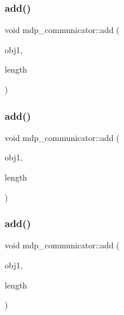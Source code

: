 \mbox{\label{classmdp__communicator_aedb0bdc142ac49ff99bfa185d8f8da09}} 
\subsubsection{\texorpdfstring{add()}{add()}\hspace{0.1cm}{\footnotesize\ttfamily [8/15]}}
{\footnotesize\ttfamily void mdp\+\_\+communicator\+::add (\begin{DoxyParamCaption}\item[{\hyperlink{mdp__global__vars_8h_aaa1ad9d0dcd2124aa5af0120d9954174}{mdp\+\_\+int} $\ast$}]{obj1,  }\item[{\hyperlink{mdp__global__vars_8h_aaa1ad9d0dcd2124aa5af0120d9954174}{mdp\+\_\+int}}]{length }\end{DoxyParamCaption})\hspace{0.3cm}{\ttfamily [inline]}}

\mbox{\label{classmdp__communicator_a931be4e0b188065e33a16877a63bfe01}} 
\subsubsection{\texorpdfstring{add()}{add()}\hspace{0.1cm}{\footnotesize\ttfamily [9/15]}}
{\footnotesize\ttfamily void mdp\+\_\+communicator\+::add (\begin{DoxyParamCaption}\item[{float $\ast$}]{obj1,  }\item[{\hyperlink{mdp__global__vars_8h_aaa1ad9d0dcd2124aa5af0120d9954174}{mdp\+\_\+int}}]{length }\end{DoxyParamCaption})\hspace{0.3cm}{\ttfamily [inline]}}

\mbox{\label{classmdp__communicator_ac78cceeab56a8e83a1921e1e930ce7d1}} 
\subsubsection{\texorpdfstring{add()}{add()}\hspace{0.1cm}{\footnotesize\ttfamily [10/15]}}
{\footnotesize\ttfamily void mdp\+\_\+communicator\+::add (\begin{DoxyParamCaption}\item[{double $\ast$}]{obj1,  }\item[{\hyperlink{mdp__global__vars_8h_aaa1ad9d0dcd2124aa5af0120d9954174}{mdp\+\_\+int}}]{length }\end{DoxyParamCaption})\hspace{0.3cm}{\ttfamily [inline]}}

